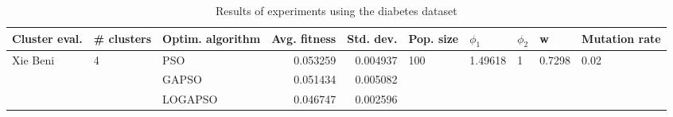 \begin{table}
\centering
\caption{Results of experiments using the diabetes dataset}
\begin{tabular}{lllrrlllll}
\toprule
            Cluster eval. &        \# clusters & Optim. algorithm &  Avg. fitness &  Std. dev. &            Pop. size &               $\phi_{1}$ &         $\phi_{2}$ &                       w &         Mutation rate \\
\midrule
\multirow{3}{*}{Xie Beni} & \multirow{3}{*}{4} &              PSO &      0.053259 &   0.004937 & \multirow{3}{*}{100} & \multirow{3}{*}{1.49618} & \multirow{3}{*}{1} & \multirow{3}{*}{0.7298} & \multirow{3}{*}{0.02} \\
                          &                    &            GAPSO &      0.051434 &   0.005082 &                      &                          &                    &                         &                       \\
                          &                    &          LOGAPSO &      0.046747 &   0.002596 &                      &                          &                    &                         &                       \\
\bottomrule
\end{tabular}
\end{table}
